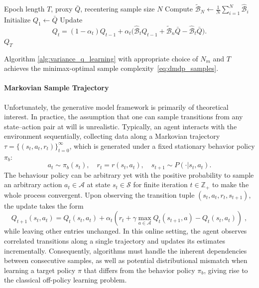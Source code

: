 \documentclass{article}
\numberwithin{equation}{section}
\newcommand{\cA}{\mathcal{A}}
\newcommand{\eqsp}{\;}
\begin{document}
\begin{algorithm}[H]
\label{alg:variance_q_learning}
\caption{RunEpoch (\(T, \bar{Q}, N\))}
\label{alg:run_epoch}
\begin{algorithmic}[1]
\REQUIRE Epoch length $T$, proxy $\bar{Q}$, recentering sample size $N$
\STATE Compute $\widetilde{\mathcal{B}}_{N}\gets \frac{1}{N} \sum_{i=1}^{N} \hat{\mathcal{B}}_{i}$ 
\STATE Initialize $Q_1 \gets \bar{Q}$
    \STATE Update 
    \begin{equation}
    Q_t = (1-\alpha_t) Q_{t-1} + \alpha_t \Big(\widehat{\mathcal{B}}_t Q_{t-1} + \widetilde{\mathcal{B}}_n \bar{Q} - \widehat{\mathcal{B}}_t \bar{Q} \Big).
\end{equation}
\ENDFOR
\RETURN $Q_{T}$
\end{algorithmic}
\end{algorithm}
Algorithm \ref{alg:variance_q_learning} with appropriate choice of \(N_m\) and \(T\) achieves the minimax-optimal sample complexity~\eqref{eq:dmdp_samples}.
\
\paragraph{Markovian Sample Trajectory}
Unfortunately, the generative model framework is primarily of theoretical interest. In practice, the assumption that one can sample transitions from any state–action pair at will is unrealistic. Typically, an agent interacts with the environment sequentially, collecting data along a Markovian trajectory \( \tau = \{(s_t,a_t,r_t)\}_{t=0}^{\infty}\), which is generated under a fixed stationary behavior policy  \(\pi_b\): 
\[
a_t \sim {\pi_b}(s_t), \quad r_t = r(s_t, a_t), \quad s_{t+1} \sim P(\cdot |s_t, a_t).
\]
The behaviour policy can be arbitrary yet with the positive probability to sample an arbitrary action $a_t\in\mathcal{A}$ at state $s_{t}\in\mathcal{S}$ for finite iteration $t\in\mathbb{Z}_{+}$ to make the whole process convergent. Upon observing the transition tuple \((s_t,a_t,r_t,s_{t+1})\), the update takes the form
\[
Q_{t+1}(s_{t}, a_{t}) =Q_{t}(s_{t}, a_{t}) + \alpha_t \left(r_t + \gamma \max_{a\in\cA} Q_{t}(s_{t+1}, a) - Q_t(s_t,a_t)\right)\eqsp,
\]
while leaving other entries unchanged.
In this online setting, the agent observes correlated transitions along a single trajectory and updates its estimates incrementally. Consequently, algorithms must handle the inherent dependencies between consecutive samples, as well as potential distributional mismatch when learning a target policy \(\pi\) that differs from the behavior policy \(\pi_b\), giving rise to the classical off-policy learning problem.
\end{document}
